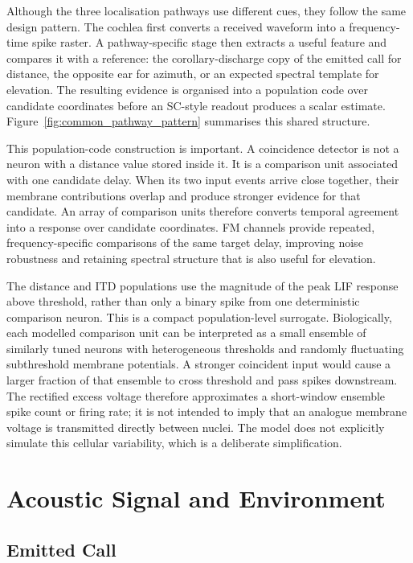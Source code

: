 Although the three localisation pathways use different cues, they follow the same design pattern. The cochlea first converts a received waveform into a frequency-time spike raster. A pathway-specific stage then extracts a useful feature and compares it with a reference: the corollary-discharge copy of the emitted call for distance, the opposite ear for azimuth, or an expected spectral template for elevation. The resulting evidence is organised into a population code over candidate coordinates before an SC-style readout produces a scalar estimate. Figure~\ref{fig:common_pathway_pattern} summarises this shared structure.



This population-code construction is important. A coincidence detector is not a neuron with a distance value stored inside it. It is a comparison unit associated with one candidate delay. When its two input events arrive close together, their membrane contributions overlap and produce stronger evidence for that candidate. An array of comparison units therefore converts temporal agreement into a response over candidate coordinates. FM channels provide repeated, frequency-specific comparisons of the same target delay, improving noise robustness and retaining spectral structure that is also useful for elevation.

The distance and ITD populations use the magnitude of the peak LIF response above threshold, rather than only a binary spike from one deterministic comparison neuron. This is a compact population-level surrogate. Biologically, each modelled comparison unit can be interpreted as a small ensemble of similarly tuned neurons with heterogeneous thresholds and randomly fluctuating subthreshold membrane potentials. A stronger coincident input would cause a larger fraction of that ensemble to cross threshold and pass spikes downstream. The rectified excess voltage therefore approximates a short-window ensemble spike count or firing rate; it is not intended to imply that an analogue membrane voltage is transmitted directly between nuclei. The model does not explicitly simulate this cellular variability, which is a deliberate simplification.


\section{Acoustic Signal and Environment}

\subsection{Emitted Call}

